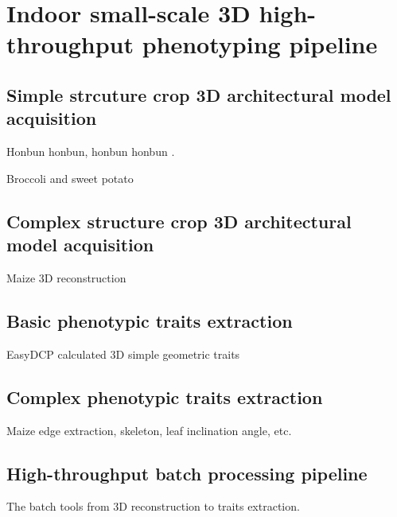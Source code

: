 \chapter{Indoor small-scale 3D high-throughput phenotyping pipeline}

\section{Simple strcuture crop 3D architectural model acquisition}

Honbun honbun, honbun honbun \citep{zhao_crop_2019}. 

Broccoli and sweet potato


\section{Complex structure crop 3D architectural model acquisition}

Maize 3D reconstruction


\section{Basic phenotypic traits extraction}



EasyDCP calculated 3D simple geometric traits

\section{Complex phenotypic traits extraction}

Maize edge extraction, skeleton, leaf inclination angle, etc.

\section{High-throughput batch processing pipeline}

The batch tools from 3D reconstruction to traits extraction.